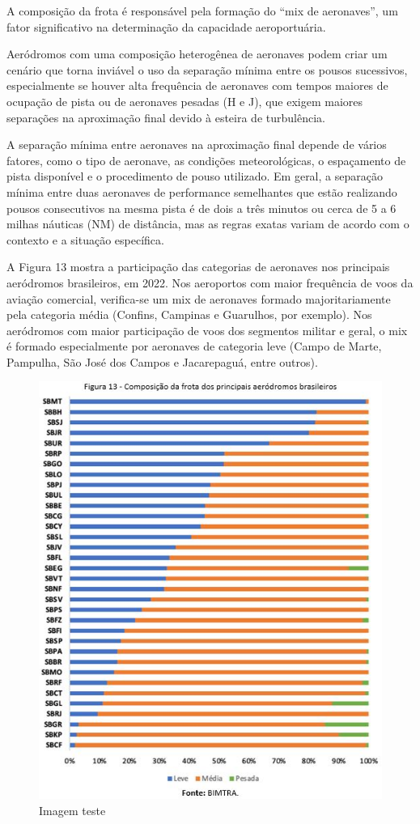 \documentclass[
]{book}
\begin{document}
A composição da frota é responsável pela formação do ``mix de aeronaves'', um fator significativo na determinação da capacidade aeroportuária.

Aeródromos com uma composição heterogênea de aeronaves podem criar um cenário que torna inviável o uso da separação mínima entre os pousos sucessivos, especialmente se houver alta frequência de aeronaves com tempos maiores de ocupação de pista ou de aeronaves pesadas (H e J), que exigem maiores separações na aproximação final devido à esteira de turbulência.

A separação mínima entre aeronaves na aproximação final depende de vários fatores, como o tipo de aeronave, as condições meteorológicas, o espaçamento de pista disponível e o procedimento de pouso utilizado. Em geral, a separação mínima entre duas aeronaves de performance semelhantes que estão realizando pousos consecutivos na mesma pista é de dois a três minutos ou cerca de 5 a 6 milhas náuticas (NM) de distância, mas as regras exatas variam de acordo com o contexto e a situação específica.

A Figura 13 mostra a participação das categorias de aeronaves nos principais aeródromos brasileiros, em 2022. Nos aeroportos com maior frequência de voos da aviação comercial, verifica-se um mix de aeronaves formado majoritariamente pela categoria média (Confins, Campinas e Guarulhos, por exemplo). Nos aeródromos com maior participação de voos dos segmentos militar e geral, o mix é formado especialmente por aeronaves de categoria leve (Campo de Marte, Pampulha, São José dos Campos e Jacarepaguá, entre outros).

\begin{figure}
\centering
\includegraphics{imagens/fig16.jpg}
\caption{Imagem teste}
\end{figure}
\end{document}
